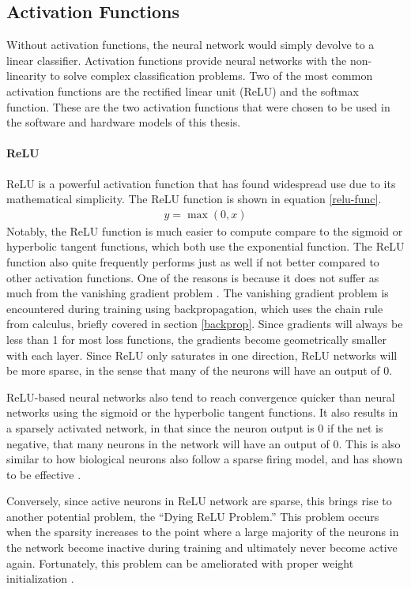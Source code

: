 \subsection{Activation Functions}
Without activation functions, the neural network would simply devolve to a linear classifier. Activation functions provide neural networks with the non-linearity to solve complex classification problems. Two of the most common activation functions are the rectified linear unit (ReLU) and the softmax function. These are the two activation functions that were chosen to be used in the software and hardware models of this thesis.

\paragraph{ReLU}
ReLU is a powerful activation function that has found widespread use due to its mathematical simplicity. The ReLU function is shown in equation \ref{relu-func}.
\begin{align}
y = \max(0, x) \label{relu-func}
\end{align}
Notably, the ReLU function is much easier to compute compare to the sigmoid or hyperbolic tangent functions, which both use the exponential function. The ReLU function also quite frequently performs just as well if not better compared to other activation functions. One of the reasons is because it does not suffer as much from the vanishing gradient problem \cite{pmlr-v15-glorot11a}. The vanishing gradient problem is encountered during training using backpropagation, which uses the chain rule from calculus, briefly covered in section \ref{backprop}. Since gradients will always be less than 1 for most loss functions, the gradients become geometrically smaller with each layer. Since ReLU only saturates in one direction, ReLU networks will be more sparse, in the sense that many of the neurons will have an output of 0. 

ReLU-based neural networks also tend to reach convergence quicker than neural networks using the sigmoid or the hyperbolic tangent functions. It also results in a sparsely activated network, in that since the neuron output is 0 if the net is negative, that many neurons in the network will have an output of 0. This is also similar to how biological neurons also follow a sparse firing model, and has shown to be effective \cite{pmlr-v15-glorot11a}. 

Conversely, since active neurons in ReLU network are sparse, this brings rise to another potential problem, the ``Dying ReLU Problem.'' This problem occurs when the sparsity increases to the point where a large majority of the neurons in the network become inactive during training and ultimately never become active again. Fortunately, this problem can be ameliorated with proper weight initialization \cite{Lu2019DyingRA}.

